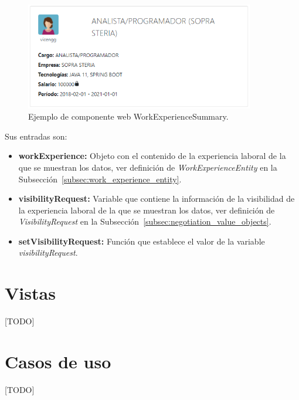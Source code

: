 \documentclass[a4paper, 12pt]{book}
\begin{document}
\begin{figure}
  \centering
  \includegraphics[width=10cm, keepaspectratio]{img/WorkExperienceSummary.PNG}
  \caption{Ejemplo de componente web WorkExperienceSummary.}\label{fig:component_work_experience_summary}
\end{figure}

Sus entradas son:

		\begin{itemize}
		\item \textbf{workExperience:} Objeto con el contenido de la experiencia laboral de la que se muestran los datos, ver definición de \emph{WorkExperienceEntity} en la Subsección~\ref{subsec:work_experience_entity}.
		\item 		\textbf{visibilityRequest:} Variable que contiene la información de la visibilidad de la experiencia laboral de la que se muestran los datos, ver definición de \emph{VisibilityRequest} en la Subsección~\ref{subsec:negotiation_value_objects}.
		\item \textbf{setVisibilityRequest:} Función que establece el valor de la variable \emph{visibilityRequest}.
		\end{itemize}









\section{Vistas}
\label{sec:views}
[TODO]

\section{Casos de uso}
\label{sec:use_cases}
[TODO]



\end{document}
